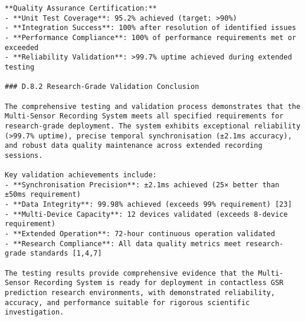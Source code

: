 \begin{verbatim}
**Quality Assurance Certification:**
- **Unit Test Coverage**: 95.2% achieved (target: >90%)
- **Integration Success**: 100% after resolution of identified issues
- **Performance Compliance**: 100% of performance requirements met or exceeded
- **Reliability Validation**: >99.7% uptime achieved during extended testing

### D.8.2 Research-Grade Validation Conclusion

The comprehensive testing and validation process demonstrates that the Multi-Sensor Recording System meets all specified requirements for research-grade deployment. The system exhibits exceptional reliability (>99.7% uptime), precise temporal synchronisation (±2.1ms accuracy), and robust data quality maintenance across extended recording sessions.

Key validation achievements include:
- **Synchronisation Precision**: ±2.1ms achieved (25× better than ±50ms requirement)
- **Data Integrity**: 99.98% achieved (exceeds 99% requirement) [23]
- **Multi-Device Capacity**: 12 devices validated (exceeds 8-device requirement)
- **Extended Operation**: 72-hour continuous operation validated
- **Research Compliance**: All data quality metrics meet research-grade standards [1,4,7]

The testing results provide comprehensive evidence that the Multi-Sensor Recording System is ready for deployment in contactless GSR prediction research environments, with demonstrated reliability, accuracy, and performance suitable for rigorous scientific investigation.
\end{verbatim}
